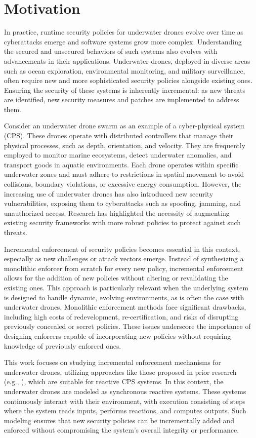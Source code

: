 \section{Motivation}
\label{Motivation}

In practice, runtime security policies for underwater drones evolve over time as cyberattacks emerge and software systems grow more complex. Understanding the secured and unsecured behaviors of such systems also evolves with advancements in their applications. Underwater drones, deployed in diverse areas such as ocean exploration, environmental monitoring, and military surveillance, often require new and more sophisticated security policies alongside existing ones. Ensuring the security of these systems is inherently incremental: as new threats are identified, new security measures and patches are implemented to address them.

Consider an underwater drone swarm as an example of a cyber-physical system (CPS). These drones operate with distributed controllers that manage their physical processes, such as depth, orientation, and velocity. They are frequently employed to monitor marine ecosystems, detect underwater anomalies, and transport goods in aquatic environments. Each drone operates within specific underwater zones and must adhere to restrictions in spatial movement to avoid collisions, boundary violations, or excessive energy consumption. However, the increasing use of underwater drones has also introduced new security vulnerabilities, exposing them to cyberattacks such as spoofing, jamming, and unauthorized access. Research has highlighted the necessity of augmenting existing security frameworks with more robust policies to protect against such threats.

Incremental enforcement of security policies becomes essential in this context, especially as new challenges or attack vectors emerge. Instead of synthesizing a monolithic enforcer from scratch for every new policy, incremental enforcement allows for the addition of new policies without altering or revalidating the existing ones. This approach is particularly relevant when the underlying system is designed to handle dynamic, evolving environments, as is often the case with underwater drones. Monolithic enforcement methods face significant drawbacks, including high costs of redevelopment, re-certification, and risks of disrupting previously concealed or secret policies. These issues underscore the importance of designing enforcers capable of incorporating new policies without requiring knowledge of previously enforced ones.

This work focuses on studying incremental enforcement mechanisms for underwater drones, utilizing approaches like those proposed in prior research (e.g., \cite{spin17, 10047915}), which are suitable for reactive CPS systems. In this context, the underwater drones are modeled as synchronous reactive systems. These systems continuously interact with their environment, with execution consisting of steps where the system reads inputs, performs reactions, and computes outputs. Such modeling ensures that new security policies can be incrementally added and enforced without compromising the system's overall integrity or performance.